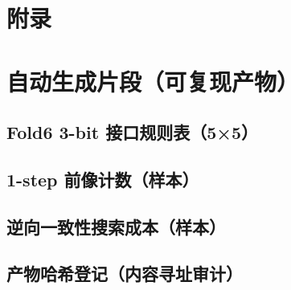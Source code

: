 
\section*{附录}








\section{自动生成片段（可复现产物）}

\subsection{Fold6 3-bit 接口规则表（5×5）}


\subsection{1-step 前像计数（样本）}


\subsection{逆向一致性搜索成本（样本）}


\subsection{产物哈希登记（内容寻址审计）}


